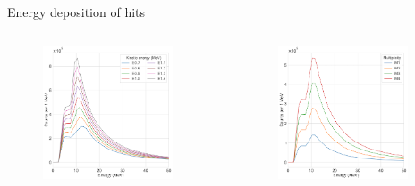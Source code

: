 \documentclass[compress, 13pt, aspectratio=169]{beamer}
\begin{document}
\begin{frame}{Energy deposition of hits}
    \vspace*{-0.6cm}
    \begin{columns}
        \begin{column}{0.5\textwidth}
            \begin{figure}[t]
                \includegraphics[keepaspectratio, width = 0.9\textwidth]{Plots/Ehit_4n}%
            \end{figure}
        \end{column}
        \begin{column}{0.5\textwidth}
            \begin{figure}[t]
                \includegraphics[keepaspectratio, width = 0.9\textwidth]{Plots/Ehit_E1}%

\end{figure}
\end{column}
\end{columns}
\end{frame}
\end{document}
